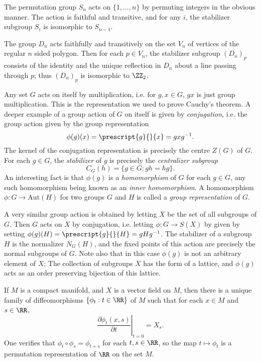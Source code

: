 \begin{example}
    The permutation group $S_n$ acts on $\{ 1, \dots, n \}$ by permuting integers in the obvious manner. The action is faithful and transitive, and for any $i$, the stabilizer subgroup $S_i$ is isomorphic to $S_{n-1}$.
\end{example}

\begin{example}
    The group $D_n$ acts faithfully and transitively on the set $V_n$ of vertices of the regular $n$ sided polygon. Then for each $p \in V_n$, the stabilizer subgroup $(D_n)_p$ consists of the identity and the unique reflection in $D_n$ about a line passing through $p$; thus $(D_n)_p$ is isomorphic to $\ZZ_2$.
\end{example}

\begin{example}
    Any set $G$ acts on itself by multiplication, i.e. for $g,x \in G$, $gx$ is just group multiplication. This is the representation we used to prove Cauchy's theorem. A deeper example of a group action of $G$ on itself is given by \emph{conjugation}, i.e. the group action given by the group representation
    \[ \phi(g)(x) = \prescript{g}{}{x} = gxg^{-1}. \]
    The kernel of the conjugation representation is precisely the centre $Z(G)$ of $G$. For each $g \in G$, the \emph{stabilizer} of $g$ is precisely the \emph{centralizer subgroup}
    \[ C_G(h) = \{ g \in G: gh = hg \}. \]
    An interesting fact is that $\phi(g)$ is a \emph{homomorphism} of $G$ for each $g \in G$, any such homomorphism being known as an \emph{inner homomorphism}. A homomorphism $\phi: G \to \text{Aut}(H)$ for two groups $G$ and $H$ is called a \emph{group representation} of $G$.
\end{example}

\begin{example}
    A very similar group action is obtained by letting $X$ be the set of all subgroups of $G$. Then $G$ acts on $X$ by conjugation, i.e. letting $\phi: G \to S(X)$ by given by setting $\phi(g)(H) = \prescript{g}{}{H} = gHg^{-1}$. The stabilizer of a subgroup $H$ is the normalizer $N_G(H)$, and the fixed points of this action are precisely the normal subgroups of $G$. Note also that in this case $\phi(g)$ is not an arbitrary element of $X$; The collection of subgroups $X$ has the form of a lattice, and $\phi(g)$ acts as an order preserving bijection of this lattice.
\end{example}

\begin{example}
    If $M$ is a compact manifold, and $X$ is a vector field on $M$, then there is a unique family of diffeomorphisms $\{ \phi_t: t \in \RR \}$ of $M$ such that for each $x \in M$ and $s \in \RR$,
    \[ \left. \frac{\partial \phi_t(x,s)}{\partial t} \right|_{t = 0} = X_s. \]
    One verifies that $\phi_t \circ \phi_s = \phi_{t + s}$ for each $t,s \in \RR$, so the map $t \mapsto \phi_t$ is a permutation representation of $\RR$ on the set $M$.
\end{example}

